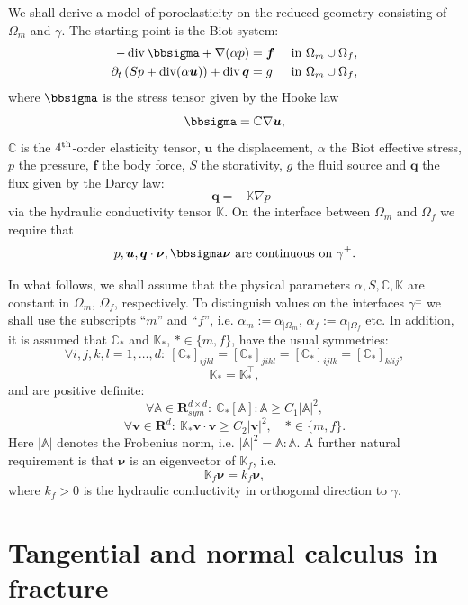 \documentclass[a4paper]{article}
\def\div{\operatorname{div}}
\def\ff{\vc f}
\def\nnu{\vc\nu}
\def\prtl{\partial}
\def\qq{\vc q}
\def\Real{{\mathbf R}}
\def\tn#1{{\mathbb{#1}}}    %
\def\uu{\vc u}
\def\vc#1{\mathbf{\boldsymbol{#1}}}     %
\def\vv{\vc v}
\newcommand{\eq}[1]{\begin{equation}#1\end{equation}}
\begin{document}
We shall derive a model of poroelasticity on the reduced geometry consisting of $\Omega_m$ and $\gamma$.
The starting point is the Biot system:
\begin{subequations}
\label{eq:biot}
\begin{align}
    \label{eq:lin_el}
    -\div \bbsigma + \nabla(\alpha p) &= \ff &&\mbox{ in }\Omega_m\cup\Omega_f,\\
\label{eq:biot_darcy}    \prtl_t\left(Sp + \div(\alpha\uu)\right) + \div\qq &= g &&\mbox{ in }\Omega_m\cup\Omega_f,
\end{align}
\end{subequations}
where $\bbsigma$ is the stress tensor given by the Hooke law
\eq{ \bbsigma = \tn C\nabla\uu, }
$\tn C$ is the $4^{\rm th}$-order elasticity tensor, $\uu$ the displacement, $\alpha$ the Biot effective stress, $p$ the pressure, $\ff$ the body force, $S$ the storativity, $g$ the fluid source and $\qq$ the flux given by the Darcy law:
\[ \quad \qq = -\tn K\nabla p \]
via the hydraulic conductivity tensor $\tn K$.
On the interface between $\Omega_m$ and $\Omega_f$ we require that
\eq{ p,\uu,\qq\cdot\nnu,\bbsigma\nnu \mbox{ are continuous on } \gamma^\pm. }

In what follows, we shall assume that the physical parameters $\alpha,S,\tn C,\tn K$ are constant in $\Omega_m$, $\Omega_f$, respectively.
To distinguish values on the interfaces $\gamma^\pm$ we shall use the subscripts ``$m$'' and ``$f$'', i.e. $\alpha_m := \alpha_{|\Omega_m}$, $\alpha_f := \alpha_{|\Omega_f}$ etc.
In addition, it is assumed that $\tn C_*$ and $\tn K_*$, $*\in\{m,f\}$, have the usual symmetries:
\eq{ \forall i,j,k,l=1,\ldots,d:~ [\tn C_*]_{ijkl}=[\tn C_*]_{jikl}=[\tn C_*]_{ijlk}=[\tn C_*]_{klij}, }
\eq{ \tn K_* = \tn K_*^\top, }
and are positive definite:
\eq{ \label{eq:pos_def_C} \forall\tn A\in\Real^{d\times d}_{sym}:~\tn C_*[\tn A]:\tn A \ge C_1|\tn A|^2, }
\eq{ \forall\vv\in\Real^d:~\tn K_*\vv\cdot\vv \ge C_2|\vv|^2,\quad *\in\{m,f\}. }
Here $|\tn A|$ denotes the Frobenius norm, i.e. $|\tn A|^2=\tn A:\tn A$.
A further natural requirement is that $\nnu$ is an eigenvector of $\tn K_f$, i.e.
\eq{\label{eq:normal_conductivity} \tn K_f\nnu = k_f\nnu, }
where $k_f>0$ is the hydraulic conductivity in orthogonal direction to $\gamma$.




\section{Tangential and normal calculus in fracture}\label{sec:calculus}
\end{document}
